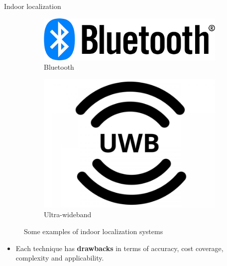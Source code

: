 \begin{frame}{Indoor localization}
\begin{figure}[!htb]
\begin{subfigure}[t]{0.24\textwidth}
            \end{subfigure}
            \hfill
            \begin{subfigure}[t]{0.24\textwidth}
                \centering
                \includegraphics[width=\linewidth]{images/bluetooth.png}
                \caption{Bluetooth}
                \label{fig:bluetooth}
            \end{subfigure}
            \hfill
            \begin{subfigure}[t]{0.24\textwidth}
                \centering
                \includegraphics[width=\linewidth]{images/uwb.jpg}
                \caption{Ultra-wideband}
                \label{fig:uwb}
            \end{subfigure}
               \caption{Some examples of indoor localization systems}
               \label{indoor}
        \end{figure}
        \pause
        \begin{itemize}
        \item Each technique has \textbf{drawbacks} in terms of accuracy, cost coverage, complexity and applicability.
    \end{itemize}
\end{frame}

